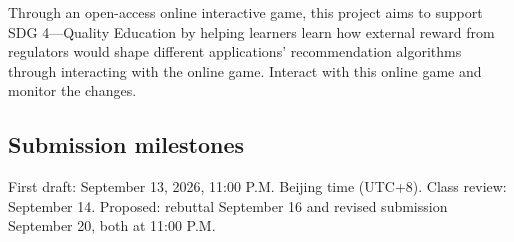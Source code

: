Through an open-access online interactive game, this project aims to support SDG 4—Quality Education by helping learners learn how external reward from regulators would shape different applications’ recommendation algorithms through interacting with the online game. Interact with this online game and monitor the changes.

\subsection*{Submission milestones}
First draft: September 13, 2026, 11:00 P.M. Beijing time (UTC+8). Class review: September 14. Proposed: rebuttal September 16 and revised submission September 20, both at 11:00 P.M.
